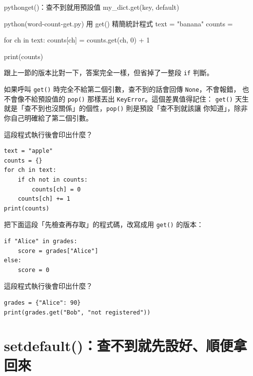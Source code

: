 \begin{code}{python}{get()：查不到就用預設值}
my_dict.get(key, default)
\end{code}

\begin{example}{python}{(word-count-get.py) 用 get() 精簡統計程式}
text = "banana"
counts = {}

for ch in text:
    counts[ch] = counts.get(ch, 0) + 1

print(counts)
\end{example}


跟上一節的版本比對一下，答案完全一樣，但省掉了一整段 \texttt{if} 判斷。


如果呼叫 \texttt{get()} 時完全不給第二個引數，查不到的話會回傳 \texttt{None}，不會報錯，
也不會像不給預設值的 \texttt{pop()} 那樣丟出 \texttt{KeyError}。這個差異值得記住：
\texttt{get()} 天生就是「查不到也沒關係」的個性，\texttt{pop()} 則是預設「查不到就該讓
你知道」，除非你自己明確給了第二個引數。

\begin{drills}[label=drills:dict-get]
\item 這段程式執行後會印出什麼？
\begin{verbatim}
text = "apple"
counts = {}
for ch in text:
    if ch not in counts:
        counts[ch] = 0
    counts[ch] += 1
print(counts)
\end{verbatim}
\item 把下面這段「先檢查再存取」的程式碼，改寫成用 \texttt{get()} 的版本：
\begin{verbatim}
if "Alice" in grades:
    score = grades["Alice"]
else:
    score = 0
\end{verbatim}
\item 這段程式執行後會印出什麼？
\begin{verbatim}
grades = {"Alice": 90}
print(grades.get("Bob", "not registered"))
\end{verbatim}
\end{drills}

\section{setdefault()：查不到就先設好、順便拿回來}
\label{sec:dict-setdefault}

